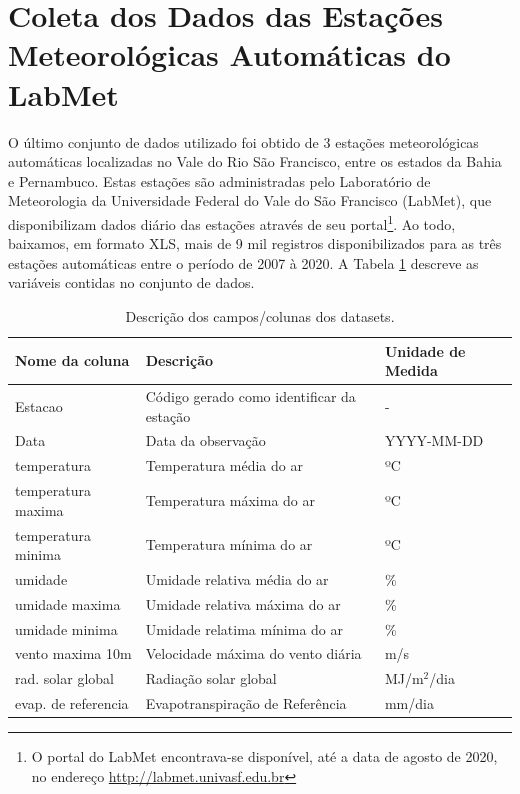 \section{Coleta dos Dados das Estações Meteorológicas Automáticas do LabMet}

O último conjunto de dados utilizado foi obtido de 3 estações meteorológicas automáticas localizadas no Vale do Rio São Francisco, entre os estados da Bahia e Pernambuco. Estas estações são administradas pelo Laboratório de Meteorologia da Universidade Federal do Vale do São Francisco (LabMet), que disponibilizam dados diário das estações através de seu portal\footnote{O portal do LabMet encontrava-se disponível, até a data de agosto de 2020, no endereço \href{http://labmet.univasf.edu.br}{http://labmet.univasf.edu.br}}. Ao todo, baixamos, em formato XLS, mais de 9 mil registros disponibilizados para as três estações automáticas entre o período de 2007 à 2020. A Tabela \ref{tab:estacoes_automaticas_labmet} descreve as variáveis contidas no conjunto de dados. 

\begin{table}[h!]
\caption{Descrição dos campos/colunas dos datasets.}
\label{tab:estacoes_automaticas_labmet}
\begin{tabular}{|l|l|l|}
\hline
\textbf{Nome da coluna} & \textbf{Descrição} & \textbf{Unidade de Medida}\\
\hline
Estacao & Código gerado como identificar da estação & - \\
\hline
Data & Data da observação & YYYY-MM-DD\\
\hline
temperatura & Temperatura média do ar & ºC\\
\hline
temperatura maxima & Temperatura máxima do ar & ºC\\
\hline
temperatura minima & Temperatura mínima do ar & ºC\\
\hline
umidade & Umidade relativa média do ar & \% \\
\hline
umidade maxima & Umidade relativa máxima do ar & \% \\
\hline
umidade minima & Umidade relatima mínima do ar & \% \\
\hline
vento maxima 10m & Velocidade máxima do vento diária  & m/s \\
\hline
rad. solar global & Radiação solar global  & MJ/m$^2$/dia\\
\hline
evap. de referencia & Evapotranspiração de Referência & mm/dia\\
\hline
\end{tabular}
\end{table}

\renewcommand{\cleardoublepage}{}
\renewcommand{\clearpage}{}
\vspace{5mm}